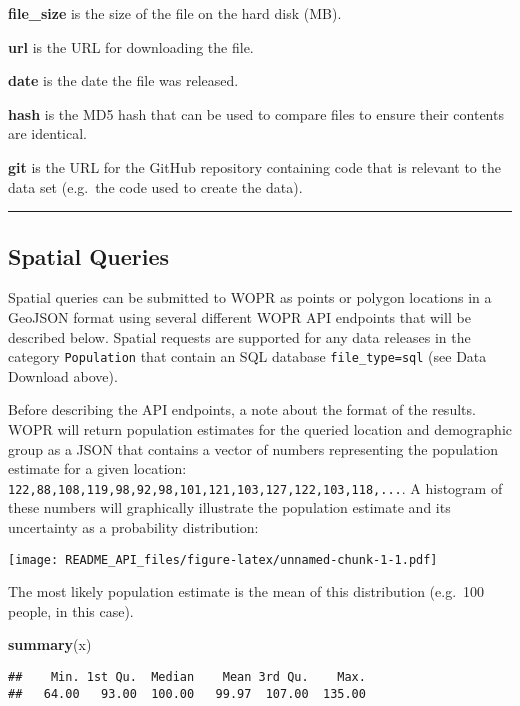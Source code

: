\documentclass[]{article}
\newenvironment{Shaded}{\begin{snugshade}}{\end{snugshade}}
\newcommand{\KeywordTok}[1]{\textcolor[rgb]{0.13,0.29,0.53}{\textbf{#1}}}
\newcommand{\NormalTok}[1]{#1}
\begin{document}
\textbf{file\_size} is the size of the file on the hard disk (MB).

\textbf{url} is the URL for downloading the file.

\textbf{date} is the date the file was released.

\textbf{hash} is the MD5 hash that can be used to compare files to
ensure their contents are identical.

\textbf{git} is the URL for the GitHub repository containing code that
is relevant to the data set (e.g.~the code used to create the data).\\

\begin{center}\rule{0.5\linewidth}{0.5pt}\end{center}

\subsection{Spatial Queries}\label{spatial-queries}

Spatial queries can be submitted to WOPR as points or polygon locations
in a GeoJSON format using several different WOPR API endpoints that will
be described below. Spatial requests are supported for any data releases
in the category \texttt{\textquotesingle{}Population\textquotesingle{}}
that contain an SQL database
\texttt{file\_type=\textquotesingle{}sql\textquotesingle{}} (see Data
Download above).

Before describing the API endpoints, a note about the format of the
results. WOPR will return population estimates for the queried location
and demographic group as a JSON that contains a vector of numbers
representing the population estimate for a given location:
\texttt{122,88,108,119,98,92,98,101,121,103,127,122,103,118,...}. A
histogram of these numbers will graphically illustrate the population
estimate and its uncertainty as a probability distribution:

\texttt{[image: README\_API\_files/figure-latex/unnamed-chunk-1-1.pdf]}

The most likely population estimate is the mean of this distribution
(e.g.~100 people, in this case).

\begin{Shaded}
\begin{Highlighting}[]
\KeywordTok{summary}\NormalTok{(x)}
\end{Highlighting}
\end{Shaded}

\begin{verbatim}
##    Min. 1st Qu.  Median    Mean 3rd Qu.    Max. 
##   64.00   93.00  100.00   99.97  107.00  135.00
\end{verbatim}
\end{document}
